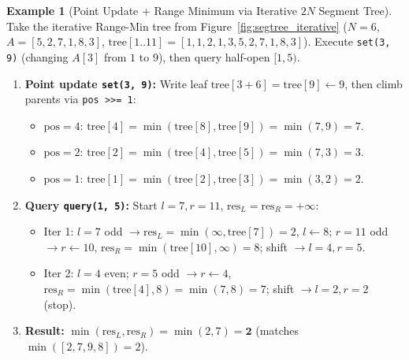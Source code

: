 \documentclass[11pt,a4paper]{article}
\theoremstyle{definition}
\newtheorem{example}{Example}[section]
\begin{document}
\begin{example}[Point Update + Range Minimum via Iterative $2N$ Segment Tree]
Take the iterative Range-Min tree from Figure~\ref{fig:segtree_iterative} ($N = 6$, $A = [5, 2, 7, 1, 8, 3]$, $\text{tree}[1..11] = [1, 1, 2, 1, 3, 5, 2, 7, 1, 8, 3]$). Execute \texttt{set(3, 9)} (changing $A[3]$ from $1$ to $9$), then query half-open $[1, 5)$.
\begin{enumerate}[itemsep=2pt, topsep=2pt]
    \item \textbf{Point update \texttt{set(3, 9)}:} Write leaf $\text{tree}[3 + 6] = \text{tree}[9] \leftarrow 9$, then climb parents via \texttt{pos >>= 1}:
    \begin{itemize}[itemsep=1pt, topsep=1pt]
        \item $\text{pos} = 4$: $\text{tree}[4] = \min(\text{tree}[8], \text{tree}[9]) = \min(7, 9) = 7$.
        \item $\text{pos} = 2$: $\text{tree}[2] = \min(\text{tree}[4], \text{tree}[5]) = \min(7, 3) = 3$.
        \item $\text{pos} = 1$: $\text{tree}[1] = \min(\text{tree}[2], \text{tree}[3]) = \min(3, 2) = 2$.
    \end{itemize}
    \item \textbf{Query \texttt{query(1, 5)}:} Start $l = 7, r = 11$, $\text{res}_L = \text{res}_R = +\infty$:
    \begin{itemize}[itemsep=1pt, topsep=1pt]
        \item Iter 1: $l = 7$ odd $\to \text{res}_L = \min(\infty, \text{tree}[7]) = 2$, $l \leftarrow 8$; $r = 11$ odd $\to r \leftarrow 10$, $\text{res}_R = \min(\text{tree}[10], \infty) = 8$; shift $\to l = 4, r = 5$.
        \item Iter 2: $l = 4$ even; $r = 5$ odd $\to r \leftarrow 4$, $\text{res}_R = \min(\text{tree}[4], 8) = \min(7, 8) = 7$; shift $\to l = 2, r = 2$ (stop).
    \end{itemize}
    \item \textbf{Result:} $\min(\text{res}_L, \text{res}_R) = \min(2, 7) = \mathbf{2}$ (matches $\min([2, 7, 9, 8]) = 2$).
\end{enumerate}
\end{example}
\end{document}
